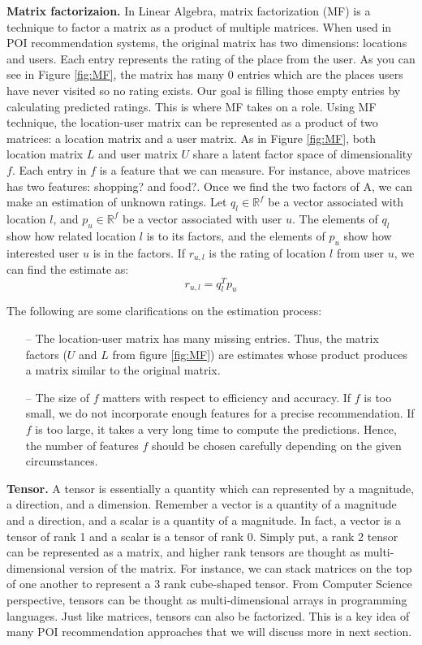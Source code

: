 \documentclass{sig-alternate}
\begin{document}
\textbf{Matrix factorizaion.} In Linear Algebra, matrix factorization (MF) is a technique to 
factor a matrix as a product of multiple matrices. When used in POI recommendation systems, 
the original matrix has two dimensions: locations and users. Each entry represents the rating of 
the place from the user. As you can see in Figure \ref{fig:MF}, the matrix
has many 0 entries which are the places users have never visited so no rating exists. 
Our goal is filling those empty entries by calculating predicted ratings. This is where MF takes on
a role. Using MF technique, the location-user matrix can be represented as a product of two matrices: 
a location matrix and a user matrix. As in Figure \ref{fig:MF}, both location matrix $L$ and user matrix $U$ share 
a latent factor space of dimensionality $f$. Each entry in $f$ is a feature that we can measure.
For instance, above matrices has two features: shopping? and food?. Once we find the two 
factors of A, we can make an estimation of unknown ratings. Let $q_l \in \mathbb{R}^f$ be a vector associated with location $l$, and 
$p_u \in \mathbb{R}^f$ be a vector associated with user $u$. The elements of $q_l$ show how related location $l$ is to its factors, 
and the elements of $p_u$ show how interested user $u$ is in the factors. If $r_{u,l}$ is the rating of location $l$ 
from user $u$, we can find the estimate as:
\begin{equation}
	r_{u,l}= q_l^T p_u
\label{eq:MF}
\end{equation}

The following are some clarifications on the estimation process:
\begin{itemize}
\item[--] The location-user matrix has many missing entries. Thus, the matrix factors ($U$ and $L$ from figure \ref{fig:MF}) are 
estimates whose product produces a matrix similar to the original matrix.
\item[--] The size of $f$ matters with respect to efficiency and accuracy. If $f$ is too small, we do not 
incorporate enough features for a precise recommendation. If $f$ is too large, it takes a very long time 
to compute the predictions. Hence, the number of features $f$ should be chosen carefully depending on 
the given circumstances.
\end{itemize}

\textbf{Tensor.} A tensor is essentially a quantity which can represented by a magnitude, a direction, and 
a dimension. Remember a vector is a quantity of a magnitude and a direction, and a scalar 
is a quantity of a magnitude. In fact, a vector is a tensor of rank 1 and a scalar is a tensor 
of rank 0. Simply put, a rank 2 tensor can be represented as a matrix, and higher rank tensors 
are thought as multi-dimensional version of the matrix. For instance, we can stack matrices on 
the top of one another to represent a 3 rank cube-shaped tensor. From Computer Science perspective, tensors can be 
thought as multi-dimensional arrays in programming languages.
Just like matrices, tensors can also be factorized. This is a key idea of many POI recommendation approaches 
that we will discuss more in next section.
\end{document}
